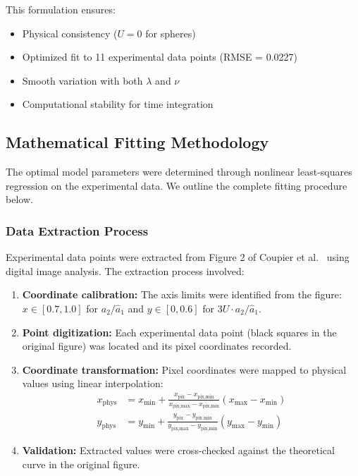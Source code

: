 \documentclass{article}
\begin{document}
This formulation ensures:
\begin{itemize}
    \item Physical consistency ($U = 0$ for spheres)
    \item Optimized fit to 11 experimental data points (RMSE = 0.0227)
    \item Smooth variation with both $\lambda$ and $\nu$
    \item Computational stability for time integration
\end{itemize}

\subsection{Mathematical Fitting Methodology}
\label{sec:fitting}

The optimal model parameters were determined through nonlinear least-squares regression on the experimental data. We outline the complete fitting procedure below.

\subsubsection{Data Extraction Process}

Experimental data points were extracted from Figure 2 of Coupier et al.~\cite{coupier2009} using digital image analysis. The extraction process involved:

\begin{enumerate}
    \item \textbf{Coordinate calibration:} The axis limits were identified from the figure: $x \in [0.7, 1.0]$ for $a_2/\hat{a}_1$ and $y \in [0, 0.6]$ for $3U \cdot a_2/\hat{a}_1$.
    
    \item \textbf{Point digitization:} Each experimental data point (black squares in the original figure) was located and its pixel coordinates recorded.
    
    \item \textbf{Coordinate transformation:} Pixel coordinates were mapped to physical values using linear interpolation:
    \begin{align}
        x_{\text{phys}} &= x_{\min} + \frac{x_{\text{pix}} - x_{\text{pix,min}}}{x_{\text{pix,max}} - x_{\text{pix,min}}} (x_{\max} - x_{\min}) \\
        y_{\text{phys}} &= y_{\min} + \frac{y_{\text{pix}} - y_{\text{pix,min}}}{y_{\text{pix,max}} - y_{\text{pix,min}}} (y_{\max} - y_{\min})
    \end{align}
    
    \item \textbf{Validation:} Extracted values were cross-checked against the theoretical curve in the original figure.
\end{enumerate}
\end{document}
